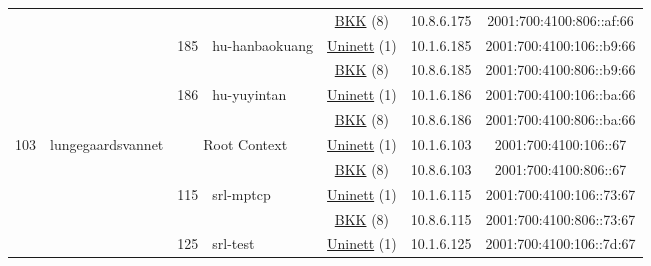 \begin{small}
\begin{center}
\begin{longtable}{|c|c|c|c|c|c|c|c|}
  &  &  &  & \multicolumn{2}{|c|}{\tiny{\href{http://bkk.no}{BKK} (8)}} & \tiny{10.8.6.175} & \tiny{2001:700:4100:806::af:66} \\* \cline{3-3}\cline{4-4}\cline{5-5}\cline{6-6}\cline{7-7}\cline{8-8}
  &  & \multirow{2}{*}{\tiny{185}} & \multicolumn{1}{|l|}{\multirow{2}{*}{\tiny{hu-hanbaokuang}}} & \multicolumn{2}{|c|}{\tiny{\href{https://www.uninett.no}{Uninett} (1)}} & \tiny{10.1.6.185} & \tiny{2001:700:4100:106::b9:66} \\* \cline{5-5}\cline{6-6}\cline{7-7}\cline{8-8}
  &  &  &  & \multicolumn{2}{|c|}{\tiny{\href{http://bkk.no}{BKK} (8)}} & \tiny{10.8.6.185} & \tiny{2001:700:4100:806::b9:66} \\* \cline{3-3}\cline{4-4}\cline{5-5}\cline{6-6}\cline{7-7}\cline{8-8}
  &  & \multirow{2}{*}{\tiny{186}} & \multicolumn{1}{|l|}{\multirow{2}{*}{\tiny{hu-yuyintan}}} & \multicolumn{2}{|c|}{\tiny{\href{https://www.uninett.no}{Uninett} (1)}} & \tiny{10.1.6.186} & \tiny{2001:700:4100:106::ba:66} \\* \cline{5-5}\cline{6-6}\cline{7-7}\cline{8-8}
  &  &  &  & \multicolumn{2}{|c|}{\tiny{\href{http://bkk.no}{BKK} (8)}} & \tiny{10.8.6.186} & \tiny{2001:700:4100:806::ba:66} \\ \hline
 \multirow{28}{*}{\tiny{103}} & \multicolumn{1}{|l|}{\multirow{28}{*}{\tiny{lungegaardsvannet}}} & \multicolumn{2}{|c|}{\multirow{2}{*}{\tiny{Root Context}}} & \multicolumn{2}{|c|}{\tiny{\href{https://www.uninett.no}{Uninett} (1)}} & \tiny{10.1.6.103} & \tiny{2001:700:4100:106::67} \\* \cline{5-5}\cline{6-6}\cline{7-7}\cline{8-8}
  &  & \multicolumn{2}{|c|}{} & \multicolumn{2}{|c|}{\tiny{\href{http://bkk.no}{BKK} (8)}} & \tiny{10.8.6.103} & \tiny{2001:700:4100:806::67} \\* \cline{3-3}\cline{4-4}\cline{5-5}\cline{6-6}\cline{7-7}\cline{8-8}
  &  & \multirow{2}{*}{\tiny{115}} & \multicolumn{1}{|l|}{\multirow{2}{*}{\tiny{srl-mptcp}}} & \multicolumn{2}{|c|}{\tiny{\href{https://www.uninett.no}{Uninett} (1)}} & \tiny{10.1.6.115} & \tiny{2001:700:4100:106::73:67} \\* \cline{5-5}\cline{6-6}\cline{7-7}\cline{8-8}
  &  &  &  & \multicolumn{2}{|c|}{\tiny{\href{http://bkk.no}{BKK} (8)}} & \tiny{10.8.6.115} & \tiny{2001:700:4100:806::73:67} \\* \cline{3-3}\cline{4-4}\cline{5-5}\cline{6-6}\cline{7-7}\cline{8-8}
  &  & \multirow{2}{*}{\tiny{125}} & \multicolumn{1}{|l|}{\multirow{2}{*}{\tiny{srl-test}}} & \multicolumn{2}{|c|}{\tiny{\href{https://www.uninett.no}{Uninett} (1)}} & \tiny{10.1.6.125} & \tiny{2001:700:4100:106::7d:67} \\* \cline{5-5}\cline{6-6}\cline{7-7}\cline{8-8}

\end{longtable}
\end{center}
\end{small}
